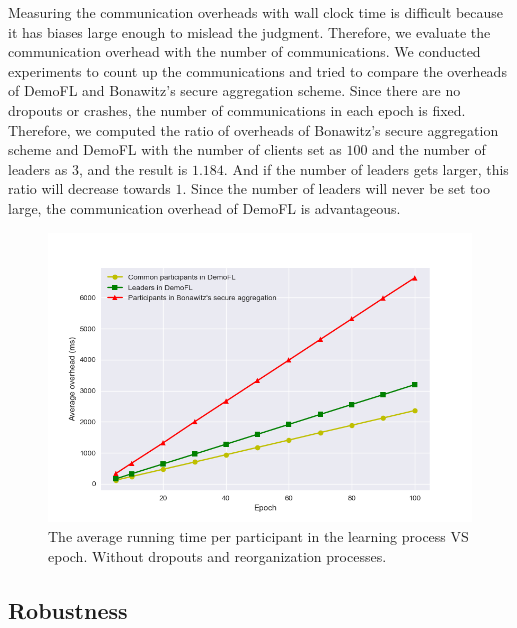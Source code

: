 Measuring the communication overheads with wall clock time is difficult because it has biases large enough to mislead the judgment. Therefore, we evaluate the communication overhead with the number of communications. We conducted experiments to count up the communications and tried to compare the overheads of DemoFL and Bonawitz's secure aggregation scheme. Since there are no dropouts or crashes, the number of communications in each epoch is fixed. Therefore, we computed the ratio of overheads of Bonawitz's secure aggregation scheme and DemoFL with the number of clients set as $100$ and the number of leaders as $3$, and the result is $1.184$. And if the number of leaders gets larger, this ratio will decrease towards $1$. Since the number of leaders will never be set too large, the communication overhead of DemoFL is advantageous.

\begin{figure}[!ht]
    \centering
    \includegraphics[width=\columnwidth]{img/learning-overhead.png}
    \caption{The average running time per participant in the learning process VS epoch. Without dropouts and reorganization processes.}
    \label{learning-overhead}
\end{figure}

\subsection{Robustness}
